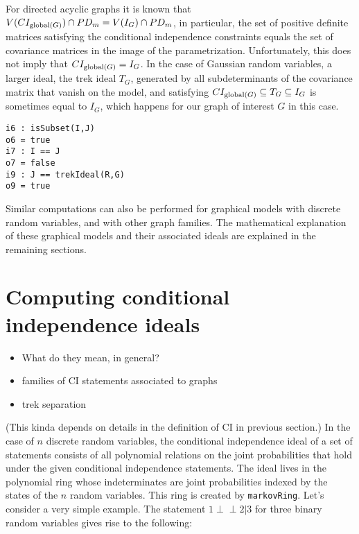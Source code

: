 \documentclass[letterpaper]{article}
\theoremstyle{definition}
\def\ci{\perp\!\!\!\perp}
\begin{document}
For directed acyclic graphs it is known that 
$V(CI_{{\rm global}(G)}) \cap PD_{m}  =  
V(I_{G}) \cap PD_{m}$,
in particular, the set of positive definite matrices
satisfying the conditional independence constraints equals the set of covariance matrices in the image of the parametrization.
Unfortunately, this does not imply that $CI_{{\rm global}(G)} 
=I_{G}$.  In the case of Gaussian random variables, a larger ideal,
the trek ideal $T_{G}$, generated by all subdeterminants of the 
covariance matrix that vanish on the model, and satisfying
$CI_{{\rm global}(G)} \subseteq T_{G} \subseteq
I_{G}$ is sometimes equal to $I_{G}$, which happens for our
graph of interest $G$ in this case.

\begin{verbatim}
i6 : isSubset(I,J)
o6 = true
i7 : I == J
o7 = false
i9 : J == trekIdeal(R,G)
o9 = true
\end{verbatim}

Similar computations can also be performed for graphical models
with discrete random variables,
and with other graph families.  The mathematical explanation of
these graphical models and their associated ideals
are explained in the remaining sections.


\section{Computing conditional independence ideals}

\begin{itemize}
\item What do they mean, in general? 
\item  families of CI statements associated to graphs
\item trek separation
\end{itemize}

(This kinda depends on details in the definition of CI in previous section.)
In the case of $n$ discrete random variables, the conditional independence ideal of a set of statements consists of all polynomial relations on the joint probabilities that hold under the given conditional independence statements.  The ideal lives in the polynomial ring whose indeterminates are joint probabilities indexed by the states of the $n$ random variables. This ring is created by {\tt markovRing}.
Let's consider a very simple example. The statement $1\ci 2 | 3$ for three binary random variables gives rise to the following:
\end{document}
